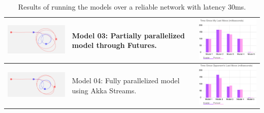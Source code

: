 \documentclass{article}
\begin{document}
\begin{table}[t]
\begin{tabular}{p{6.5cm}p{4cm}p{6.5cm} }
		\includegraphics[width=6cm]{model03}&Model 03: Partially parallelized model through Futures.&\includegraphics[width=6cm]{my_move}\\			
		\hline
		\includegraphics[width=6cm]{model04}&Model 04: Fully parallelized model using Akka Streams.&\includegraphics[width=6cm]{opp_move}\\			
		\hline
	\end{tabular}
	\caption{Results of running the models over a reliable network with latency 30ms.}
	\label{tab:ResultsNoVPN}
\end{table}
\end{document}
